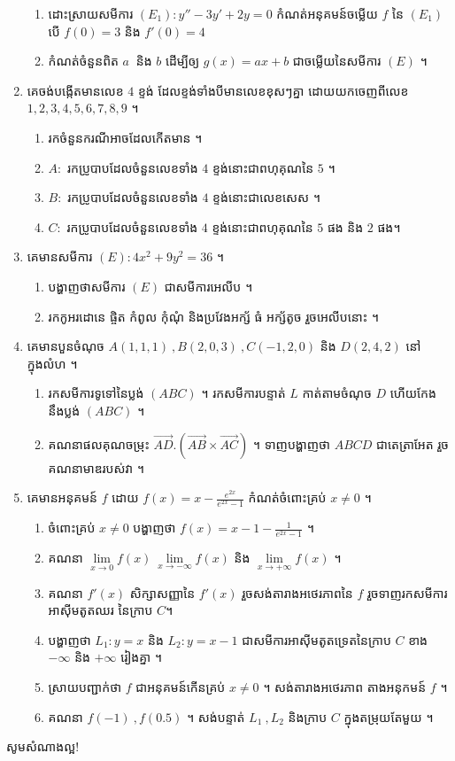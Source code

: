 \documentclass[a4paper, 11pt]{exam}
\begin{document}
\begin{enumerate}[I]
	\begin{enumerate}[a]
		\item ដោះស្រាយសមីការ $(E_1): y''-3y'+2y=0$ កំណត់អនុគមន៍ចម្លើយ $f$ នៃ $(E_1)$ បើ $f(0)=3$ និង $f'(0)=4$
		\item កំណត់ចំនួនពិត $a~$ និង $b$ ដើម្បីឲ្យ $g(x)=ax+b$ ជាចម្លើយនៃសមីការ $(E)$ ។
	\end{enumerate} 
	\item គេចង់បង្កើតមានលេខ $4$ ខ្ទង់ ដែលខ្ទង់ទាំងបីមានលេខខុសៗគ្នា ដោយយកចេញពីលេខ $1,2,3,4,5,6,7,8,9$ ។
	\begin{enumerate}[a]
		\item រកចំនួនករណីអាចដែលកើតមាន ។
		\item $A:$ រកប្រូបាបដែលចំនួនលេខទាំង $4$ ខ្ទង់នោះជាពហុគុណនៃ $5$ ។
		\item $B:$ រកប្រូបាបដែលចំនួនលេខទាំង $4$ ខ្ទង់នោះជាលេខសេស ។
		\item $C:$ រកប្រូបាបដែលចំនួនលេខទាំង $4$ ខ្ទង់នោះជាពហុគុណនៃ $5$ ផង និង $2$ ផង។ 
	\end{enumerate}
	\item គេមានសមីការ $(E): 4x^2+9y^2=36$ ។
	\begin{enumerate}[a]
		\item បង្ហាញថាសមីការ $(E)$ ជាសមីការអេលីប ។
		\item រកកូអរដោនេ ផ្ចិត កំពូល កុំណុំ និងប្រវែងអក្ស័  ធំ  អក្ស័តូច រួចអេលីបនោះ​ ។ 
	\end{enumerate}
	\item គេមានបួនចំណុច $A(1,1,1)~,B(2,0,3)~,C(-1,2,0)$ និង $D(2,4,2)$ នៅក្នុងលំហ ។
	\begin{enumerate}[a]
		\item រកសមីការទូទៅនៃប្លង់ $(ABC)$ ។ រកសមីការបន្ទាត់ $L$ កាត់តាមចំណុច $D$ ហើយកែង នឹងប្លង់ $(ABC)$ ។
		\item គណនាផលគុណចម្រុះ $\vec{AD}.(\vec{AB}\times\vec{AC})$ ។ ទាញបង្ហាញថា $ABCD$ ជាតេត្រាអែត រួចគណនាមាឌរបស់វា ។ 
	\end{enumerate} 
	\item គេមានអនុគមន៍ $f$ ដោយ $f(x) = x-\frac{e^{2x}}{e^{2x}-1}$ កំណត់ចំពោះគ្រប់ $x\neq0$ ។
	\begin{enumerate}[a]
		\item ចំពោះគ្រប់ $x\neq0$ បង្ហាញថា $f(x)=x-1-\frac{1}{e^{2x}-1}$ ។
		\item គណនា $\lim\limits_{x\to0} f(x)~\lim\limits_{x\to-\infty} f(x)$ និង $\lim\limits_{x\to+\infty} f(x)$ ។
		\item គណនា $f'(x)$ សិក្សាសញ្ញានៃ $f'(x)$ រួចសង់តារាងអថេរភាពនៃ $f$ រួចទាញរកសមីការអាស៊ីមតូតឈរ នៃក្រាប $C$។
		\item បង្ហាញថា $L_1:y=x$ និង $L_2: y=x-1$ ជាសមីការអាស៊ីមតូតទ្រេតនៃក្រាប $C$ ខាង $-\infty$ និង $+\infty$ រៀងគ្នា ។
		\item ស្រាយបញ្ជាក់ថា $f$ ជាអនុគមន៍កើនគ្រប់ $x\neq0$ ។ សង់តារាងអថេរភាព តាងអនុកមន៍ $f$ ។
		\item គណនា $f(-1)~,f(0.5)$ ។ សង់បន្ទាត់ $L_1~,L_2$ និងក្រាប $C$ ក្នុងតម្រុយតែមួយ ។
	\end{enumerate}
\end{enumerate}
\begin{center}
	\sffamily\color{black}
	សូមសំណាងល្អ!
\end{center}\newpage
\end{document}
